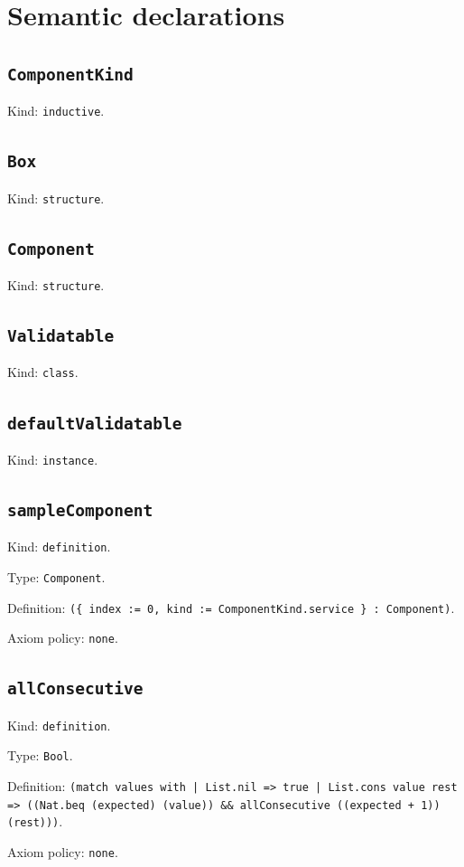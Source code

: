 \documentclass[11pt]{article}
\begin{document}
\section*{Semantic declarations}
\subsection*{\texttt{ComponentKind}}
\noindent Kind: \texttt{inductive}.\par
\subsection*{\texttt{Box}}
\noindent Kind: \texttt{structure}.\par
\subsection*{\texttt{Component}}
\noindent Kind: \texttt{structure}.\par
\subsection*{\texttt{Validatable}}
\noindent Kind: \texttt{class}.\par
\subsection*{\texttt{defaultValidatable}}
\noindent Kind: \texttt{instance}.\par
\subsection*{\texttt{sampleComponent}}
\noindent Kind: \texttt{definition}.\par
\noindent Type: \texttt{Component}.\par
\noindent Definition: \texttt{(\{ index := 0, kind := ComponentKind.service \} : Component)}.\par
\noindent Axiom policy: \texttt{none}.\par
\subsection*{\texttt{allConsecutive}}
\noindent Kind: \texttt{definition}.\par
\noindent Type: \texttt{Bool}.\par
\noindent Definition: \texttt{(match values with | List.nil => true | List.cons value rest => ((Nat.beq (expected) (value)) \&\& allConsecutive ((expected + 1)) (rest)))}.\par
\noindent Axiom policy: \texttt{none}.\par
\end{document}
